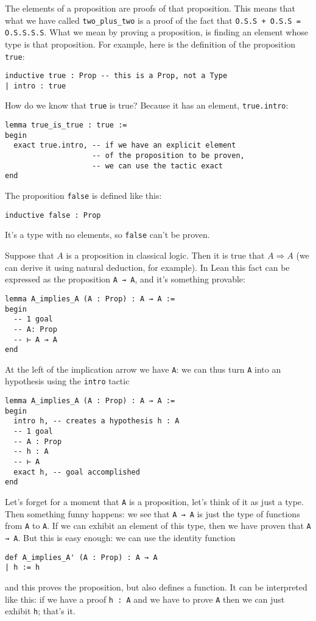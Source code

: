 \documentclass{book}
\theoremstyle{definition}
\theoremstyle{remark}
\theoremstyle{plain}
\begin{document}
The elements of a proposition are proofs of that proposition.
This means that what we have called \lstinline{two_plus_two} is a proof of the fact that \lstinline{O.S.S + O.S.S = O.S.S.S.S}.
What we mean by proving a proposition, is finding an element whose type is that proposition.
For example, here is the definition of the proposition \lstinline{true}:
\begin{lstlisting}
inductive true : Prop -- this is a Prop, not a Type
| intro : true    
\end{lstlisting}
How do we know that \lstinline{true} is true? Because it has an element, \lstinline{true.intro}:
\begin{lstlisting}
lemma true_is_true : true :=
begin
  exact true.intro, -- if we have an explicit element
                    -- of the proposition to be proven,
                    -- we can use the tactic exact
end
\end{lstlisting}
The proposition \lstinline{false} is defined like this:
\begin{lstlisting}
inductive false : Prop  
\end{lstlisting}
It's a type with no elements, so \lstinline{false} can't be proven.

Suppose that $A$ is a proposition in classical logic.
Then it is true that $A \Rightarrow A$ (we can derive it using natural deduction, for example).
In Lean this fact can be expressed as the proposition \lstinline{A → A}, and it's something provable:
\begin{lstlisting}
lemma A_implies_A (A : Prop) : A → A :=
begin
  -- 1 goal
  -- A: Prop
  -- ⊢ A → A
end
\end{lstlisting}
At the left of the implication arrow we have \lstinline{A}:
we can thus turn \lstinline{A} into an hypothesis using the \lstinline{intro} tactic
\begin{lstlisting}
lemma A_implies_A (A : Prop) : A → A :=
begin
  intro h, -- creates a hypothesis h : A
  -- 1 goal
  -- A : Prop
  -- h : A
  -- ⊢ A
  exact h, -- goal accomplished
end
\end{lstlisting}
Let's forget for a moment that \lstinline{A} is a proposition, let's think of it as just a type.
Then something funny happens: we see that \lstinline{A → A} is just the type of functions from \lstinline{A} to \lstinline{A}.
If we can exhibit an element of this type, then we have proven that \lstinline{A → A}.
But this is easy enough: we can use the identity function
\begin{lstlisting}
def A_implies_A' (A : Prop) : A → A
| h := h    
\end{lstlisting}
and this proves the proposition, but also defines a function.
It can be interpreted like this:
if we have a proof \lstinline{h : A} and we have to prove \lstinline{A} then we can just exhibit \lstinline{h}; that's it.
\end{document}
